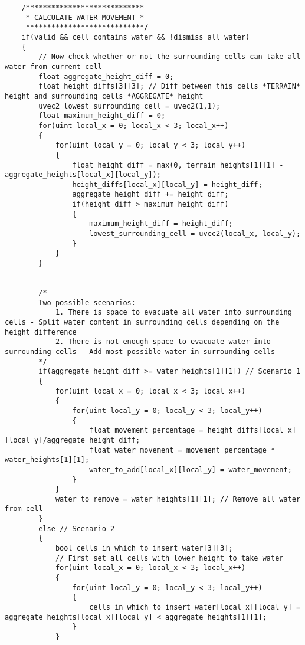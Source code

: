 \begin{verbatim}
    /****************************
     * CALCULATE WATER MOVEMENT *
     ****************************/
    if(valid && cell_contains_water && !dismiss_all_water)
    {
        // Now check whether or not the surrounding cells can take all water from current cell
        float aggregate_height_diff = 0;
        float height_diffs[3][3]; // Diff between this cells *TERRAIN* height and surrounding cells *AGGREGATE* height
        uvec2 lowest_surrounding_cell = uvec2(1,1);
        float maximum_height_diff = 0;
        for(uint local_x = 0; local_x < 3; local_x++)
        {
            for(uint local_y = 0; local_y < 3; local_y++)
            {
                float height_diff = max(0, terrain_heights[1][1] - aggregate_heights[local_x][local_y]);
                height_diffs[local_x][local_y] = height_diff;
                aggregate_height_diff += height_diff;
                if(height_diff > maximum_height_diff)
                {
                    maximum_height_diff = height_diff;
                    lowest_surrounding_cell = uvec2(local_x, local_y);
                }
            }
        }


        /*
        Two possible scenarios:
            1. There is space to evacuate all water into surrounding cells - Split water content in surrounding cells depending on the height difference
            2. There is not enough space to evacuate water into surrounding cells - Add most possible water in surrounding cells
        */
        if(aggregate_height_diff >= water_heights[1][1]) // Scenario 1
        {
            for(uint local_x = 0; local_x < 3; local_x++)
            {
                for(uint local_y = 0; local_y < 3; local_y++)
                {
                    float movement_percentage = height_diffs[local_x][local_y]/aggregate_height_diff;
                    float water_movement = movement_percentage * water_heights[1][1];
                    water_to_add[local_x][local_y] = water_movement;
                }
            }
            water_to_remove = water_heights[1][1]; // Remove all water from cell
        }
        else // Scenario 2
        {
            bool cells_in_which_to_insert_water[3][3];
            // First set all cells with lower height to take water
            for(uint local_x = 0; local_x < 3; local_x++)
            {
                for(uint local_y = 0; local_y < 3; local_y++)
                {
                    cells_in_which_to_insert_water[local_x][local_y] = aggregate_heights[local_x][local_y] < aggregate_heights[1][1];
                }
            }


\end{verbatim}
